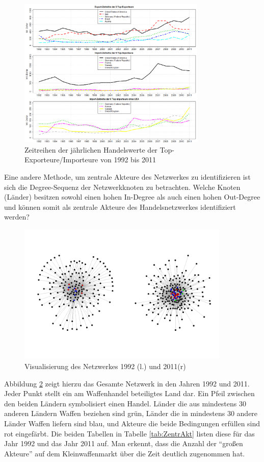 \documentclass[a4paper,ngerman,oneside,titlepage,bibliography=totoc,11pt]{scrreprt}
\begin{document}
\begin{figure}[ht]
	\centering
		\includegraphics[width= 0.8\textwidth]{Grafiken/ts_tops.png}
	\caption{Zeitreihen der jährlichen Handelswerte der Top-Exporteure/Importeure von 1992 bis 2011}
	\label{fig:ts_tops}
\end{figure}
Eine andere Methode, um zentrale Akteure des Netzwerkes zu identifizieren ist sich die Degree-Sequenz der Netzwerkknoten zu betrachten. Welche Knoten (Länder) besitzen sowohl einen hohen In-Degree als auch einen hohen Out-Degree und können somit als zentrale Akteure des Handelsnetzwerkes identifiziert werden?
\begin{figure}[ht]
	\centering
		\includegraphics[width=0.90\textwidth]{Grafiken/ts_network.png}
	\caption{Visualisierung des Netzwerkes 1992 (l.) und 2011(r)}
	\label{fig:ts_network}
\end{figure}

Abbildung \ref{fig:ts_network} zeigt hierzu das Gesamte Netzwerk in den Jahren 1992 und 2011. Jeder Punkt stellt ein am Waffenhandel beteiligtes Land dar. Ein Pfeil zwischen den beiden Ländern symbolisiert einen Handel. Länder die aus mindestens 30 anderen Ländern Waffen beziehen sind grün, Länder die in mindestens 30 andere Länder Waffen liefern sind blau, und Akteure die beide Bedingungen erfüllen sind rot eingefärbt. Die beiden Tabellen in Tabelle \ref{tab:ZentrAkt} listen diese für das Jahr 1992 und das Jahr 2011 auf. Man erkennt, dass die Anzahl der "`großen Akteure"' auf dem Kleinwaffenmarkt über die Zeit deutlich zugenommen hat.
\end{document}
